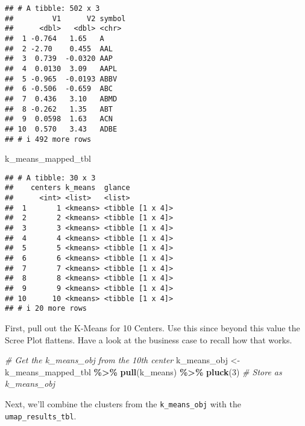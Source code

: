 \documentclass[
]{article}
\newenvironment{Shaded}{\begin{snugshade}}{\end{snugshade}}
\newcommand{\CommentTok}[1]{\textcolor[rgb]{0.56,0.35,0.01}{\textit{#1}}}
\newcommand{\DecValTok}[1]{\textcolor[rgb]{0.00,0.00,0.81}{#1}}
\newcommand{\FunctionTok}[1]{\textcolor[rgb]{0.13,0.29,0.53}{\textbf{#1}}}
\newcommand{\NormalTok}[1]{#1}
\newcommand{\OtherTok}[1]{\textcolor[rgb]{0.56,0.35,0.01}{#1}}
\newcommand{\SpecialCharTok}[1]{\textcolor[rgb]{0.81,0.36,0.00}{\textbf{#1}}}
\begin{document}
\begin{verbatim}
## # A tibble: 502 x 3
##         V1      V2 symbol
##      <dbl>   <dbl> <chr> 
##  1 -0.764   1.65   A     
##  2 -2.70    0.455  AAL   
##  3  0.739  -0.0320 AAP   
##  4  0.0130  3.09   AAPL  
##  5 -0.965  -0.0193 ABBV  
##  6 -0.506  -0.659  ABC   
##  7  0.436   3.10   ABMD  
##  8 -0.262   1.35   ABT   
##  9  0.0598  1.63   ACN   
## 10  0.570   3.43   ADBE  
## # i 492 more rows
\end{verbatim}

\begin{Shaded}
\begin{Highlighting}[]
\NormalTok{k\_means\_mapped\_tbl }
\end{Highlighting}
\end{Shaded}

\begin{verbatim}
## # A tibble: 30 x 3
##    centers k_means  glance          
##      <int> <list>   <list>          
##  1       1 <kmeans> <tibble [1 x 4]>
##  2       2 <kmeans> <tibble [1 x 4]>
##  3       3 <kmeans> <tibble [1 x 4]>
##  4       4 <kmeans> <tibble [1 x 4]>
##  5       5 <kmeans> <tibble [1 x 4]>
##  6       6 <kmeans> <tibble [1 x 4]>
##  7       7 <kmeans> <tibble [1 x 4]>
##  8       8 <kmeans> <tibble [1 x 4]>
##  9       9 <kmeans> <tibble [1 x 4]>
## 10      10 <kmeans> <tibble [1 x 4]>
## # i 20 more rows
\end{verbatim}

First, pull out the K-Means for 10 Centers. Use this since beyond this
value the Scree Plot flattens. Have a look at the business case to
recall how that works.

\begin{Shaded}
\begin{Highlighting}[]
\CommentTok{\# Get the k\_means\_obj from the 10th center}
\NormalTok{k\_means\_obj }\OtherTok{\textless{}{-}}\NormalTok{ k\_means\_mapped\_tbl }\SpecialCharTok{\%\textgreater{}\%}
    \FunctionTok{pull}\NormalTok{(k\_means) }\SpecialCharTok{\%\textgreater{}\%}
    \FunctionTok{pluck}\NormalTok{(}\DecValTok{3}\NormalTok{)}
\CommentTok{\# Store as k\_means\_obj}
\end{Highlighting}
\end{Shaded}

Next, we'll combine the clusters from the \texttt{k\_means\_obj} with
the \texttt{umap\_results\_tbl}.
\end{document}
